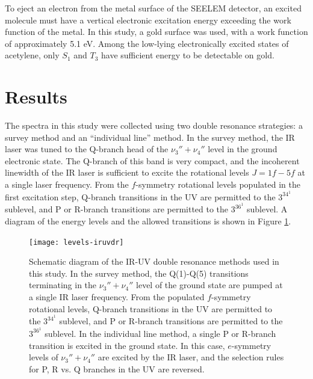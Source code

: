 \documentclass[12pt]{mitthesis}
\begin{document}
To eject an electron from the metal surface of the SEELEM detector, an
excited molecule must have a vertical electronic excitation energy
exceeding the work function of the metal.  In this study, a gold
surface was used, with a work function of approximately 5.1 eV.
Among the low-lying electronically excited states of acetylene, only
$S_1$ and $T_3$ have sufficient energy to be detectable on gold.





















\section{Results}

The spectra in this study were collected using two double resonance
strategies: a survey method and an ``individual line'' method.  In the
survey method, the IR laser was tuned to the Q-branch head of the
$\nu_3''+\nu_4''$ level in the ground electronic state.  The Q-branch of
this band is very compact, and the incoherent linewidth of the IR
laser is sufficient to excite the rotational levels $J=1f-5f$ at a
single laser frequency.  From the $f$-symmetry rotational levels
populated in the first excitation step, Q-branch transitions in the UV
are permitted to the $3^34^1$  sublevel, and P or R-branch
transitions are permitted to the $3^36^1$  sublevel.  A diagram
of the energy levels and the allowed transitions is shown in Figure
\ref{fig:levels-iruvdr}.

\begin{figure}
  \centering
  
  \texttt{[image: levels-iruvdr]}

  \caption{Schematic diagram of the IR-UV double resonance methods
    used in this study.  In the survey method, the Q(1)-Q(5)
    transitions terminating in the $\nu_3''+\nu_4''$ level of the
    ground state are pumped at a single IR laser frequency.  From the
    populated $f$-symmetry rotational levels, Q-branch transitions in
    the UV are permitted to the $3^34^1$  sublevel, and P or
    R-branch transitions are permitted to the $3^36^1$ 
    sublevel.  In the individual line method, a single P or R-branch
    transition is excited in the ground state.  In this case,
    $e$-symmetry levels of $\nu_3''+\nu_4''$ are excited by the IR
    laser, and the selection rules for P, R vs. Q branches in the UV
    are reversed.}
  \label{fig:levels-iruvdr}
\end{figure}
\end{document}
